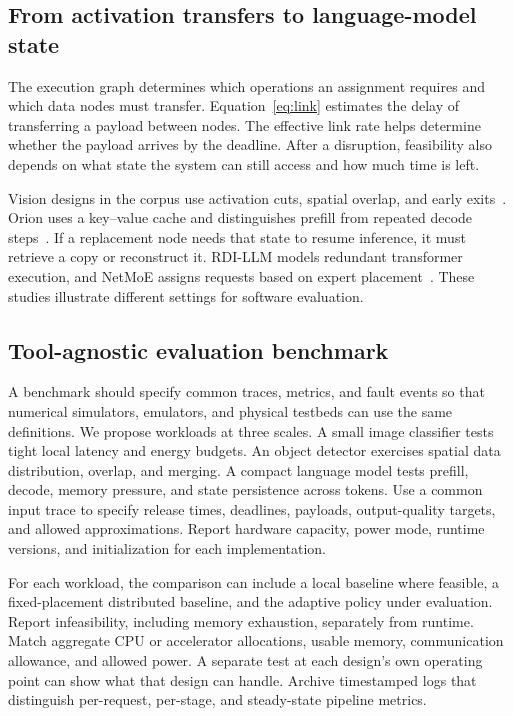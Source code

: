 \documentclass[journal]{IEEEtran}
\begin{document}
\subsection{From activation transfers to language-model state}
The execution graph determines which operations an assignment requires and which data nodes must transfer. Equation~\ref{eq:link} estimates the delay of transferring a payload between nodes. The effective link rate helps determine whether the payload arrives by the deadline. After a disruption, feasibility also depends on what state the system can still access and how much time is left.

Vision designs in the corpus use activation cuts, spatial overlap, and early exits~\cite{R0010,R0014,R0075}. Orion uses a key--value cache and distinguishes prefill from repeated decode steps~\cite{R0074}. If a replacement node needs that state to resume inference, it must retrieve a copy or reconstruct it. RDI-LLM models redundant transformer execution, and NetMoE assigns requests based on expert placement~\cite{R0110,R0118}. These studies illustrate different settings for software evaluation.

\subsection{Tool-agnostic evaluation benchmark}
A benchmark should specify common traces, metrics, and fault events so that numerical simulators, emulators, and physical testbeds can use the same definitions. We propose workloads at three scales. A small image classifier tests tight local latency and energy budgets. An object detector exercises spatial data distribution, overlap, and merging. A compact language model tests prefill, decode, memory pressure, and state persistence across tokens. Use a common input trace to specify release times, deadlines, payloads, output-quality targets, and allowed approximations. Report hardware capacity, power mode, runtime versions, and initialization for each implementation.

For each workload, the comparison can include a local baseline where feasible, a fixed-placement distributed baseline, and the adaptive policy under evaluation. Report infeasibility, including memory exhaustion, separately from runtime. Match aggregate CPU or accelerator allocations, usable memory, communication allowance, and allowed power. A separate test at each design's own operating point can show what that design can handle. Archive timestamped logs that distinguish per-request, per-stage, and steady-state pipeline metrics.
\end{document}
